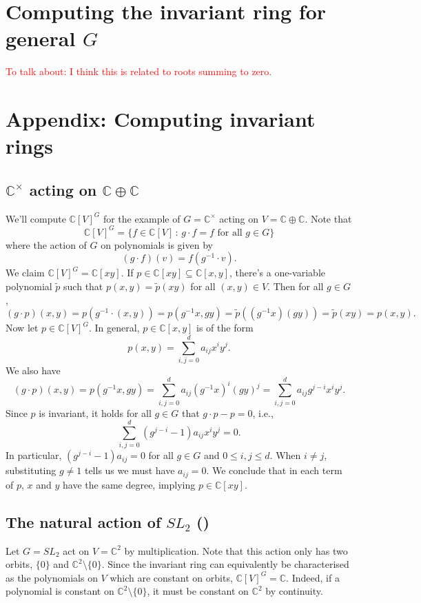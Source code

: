 \documentclass[12pt]{amsart}
\newcommand{\C}{\mathbb{C}}
\theoremstyle{remark}
\theoremstyle{remark}
\begin{document}
\section*{Computing the invariant ring for general $G$}
\textcolor{red}{To talk about: I think this is related to roots summing to zero.}

\section*{Appendix: Computing invariant rings}
\subsection*{$\C^\times$ acting on $\C \oplus \C$}
We'll compute $\mathbb{C}[V]^G$ for the example of $G = \mathbb{C}^\times$ acting on $V = \mathbb{C} \oplus \mathbb{C}$.
Note that 
$$\mathbb{C}[V]^G = \{f \in \mathbb{C}[V] \, : \, g \cdot f = f \text{ for all } g \in G\}$$
 where the action of $G$ on polynomials is given by
$$(g \cdot f)(v) = f(g^{-1} \cdot v).$$
We claim $\mathbb{C}[V]^G = \mathbb{C}[xy]$.
If $p \in \mathbb{C}[xy] \subseteq \mathbb{C}[x, y]$, there's a one-variable polynomial $\tilde p$ such that $p(x, y) = \tilde p (xy)$ for all $(x, y) \in V$.
Then for all $g \in G$,
$$(g \cdot p)(x, y) = p(g^{-1} \cdot (x, y)) = p(g^{-1} x, g y) = \tilde p((g^{-1} x)(g y)) = \tilde p(xy) = p(x, y).$$
Now let $p \in \C[V]^G$.
In general, $p \in \C[x, y]$ is of the form 
$$p(x, y) = \sum_{i, j=0}^d a_{ij} x^i y^j.$$
We also have
$$(g \cdot p)(x, y) = p(g^{-1} x, g y) = \sum_{i, j=0}^d a_{ij} (g^{-1} x)^i (g y)^j = \sum_{i, j=0}^d a_{ij} g^{j - i} x^i y^j.$$
Since $p$ is invariant, it holds for all $g \in G$ that $g \cdot p - p = 0$, i.e.,
$$\sum_{i, j=0}^d (g^{j-i} - 1)a_{ij} x^i y^j = 0.$$
In particular, $(g^{j-i} - 1) a_{ij} = 0$ for all $g \in G$ and $0 \le i, j \le d$.
When $i \ne j$, substituting $g \ne 1$ tells us we must have $a_{ij} = 0$.
We conclude that in each term of $p$, $x$ and $y$ have the same degree, implying $p \in \C[xy]$.

\subsection*{The natural action of $SL_2$ (\cite[Exercise 5]{KP96})}
Let $G = SL_2$ act on $V = \C^2$ by multiplication.
Note that this action only has two orbits, $\{0\}$ and $\C^2 \setminus \{0\}$.
Since the invariant ring can equivalently be characterised as the polynomials on $V$ which are constant on orbits, $\C[V]^G = \C$.
Indeed, if a polynomial is constant on $\C^2\setminus \{0\}$, it must be constant on $\C^2$ by continuity.
\end{document}
